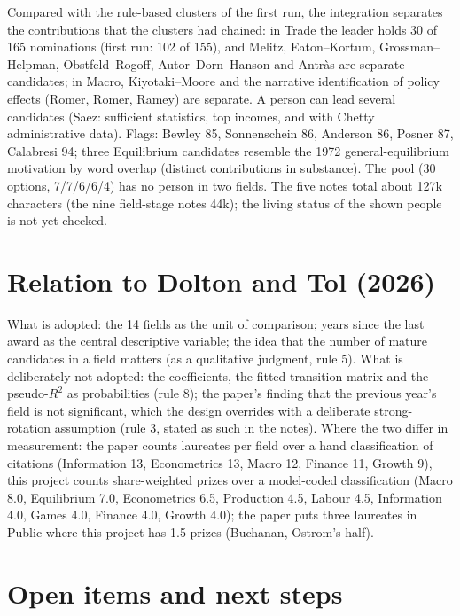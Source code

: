 \documentclass[11pt,a4paper]{article}
\begin{document}
Compared with the rule-based clusters of the first run, the integration separates the contributions that the clusters
had chained: in Trade the leader holds 30 of 165 nominations (first run: 102 of 155), and Melitz, Eaton--Kortum,
Grossman--Helpman, Obstfeld--Rogoff, Autor--Dorn--Hanson and Antr\`as are separate candidates; in Macro, Kiyotaki--Moore
and the narrative identification of policy effects (Romer, Romer, Ramey) are separate. A person can lead several
candidates (Saez: sufficient statistics, top incomes, and with Chetty administrative data). Flags: Bewley 85,
Sonnenschein 86, Anderson 86, Posner 87, Calabresi 94; three Equilibrium candidates resemble the 1972 general-equilibrium
motivation by word overlap (distinct contributions in substance). The pool (30 options, 7/7/6/6/4) has no person in
two fields. The five notes total about 127k characters (the nine field-stage notes 44k); the living status of the
shown people is not yet checked.

\section{Relation to Dolton and Tol (2026)}

What is adopted: the 14 fields as the unit of comparison; years since the last award as the central descriptive
variable; the idea that the number of mature candidates in a field matters (as a qualitative judgment, rule 5). What
is deliberately not adopted: the coefficients, the fitted transition matrix and the pseudo-$R^2$ as probabilities
(rule 8); the paper's finding that the previous year's field is not significant, which the design overrides with a
deliberate strong-rotation assumption (rule 3, stated as such in the notes). Where the two differ in measurement: the
paper counts laureates per field over a hand classification of citations (Information 13, Econometrics 13, Macro 12,
Finance 11, Growth 9), this project counts share-weighted prizes over a model-coded classification (Macro 8.0,
Equilibrium 7.0, Econometrics 6.5, Production 4.5, Labour 4.5, Information 4.0, Games 4.0, Finance 4.0, Growth 4.0);
the paper puts three laureates in Public where this project has 1.5 prizes (Buchanan, Ostrom's half).

\section{Open items and next steps}
\end{document}
